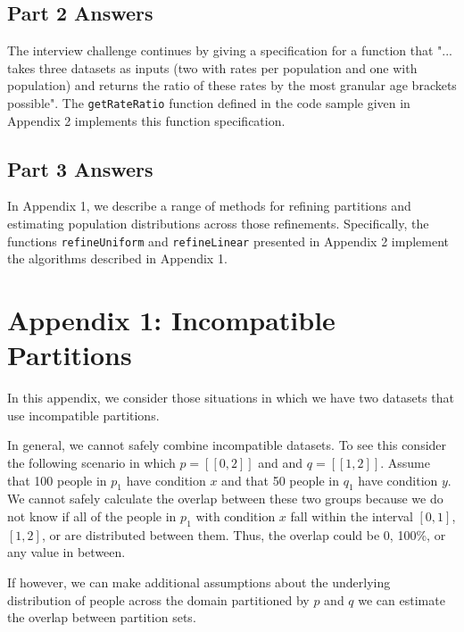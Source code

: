 \documentclass[]{article}
\begin{document}
\hypertarget{part-2-answers}{%
\subsection{Part 2 Answers}\label{part-2-answers}}

The interview challenge continues by giving a specification for a
function that "... takes three datasets as inputs (two with rates per
population and one with population) and returns the ratio of these rates
by the most granular age brackets possible". The \texttt{getRateRatio}
function defined in the code sample given in Appendix 2 implements this
function specification.

\hypertarget{part-3-answers}{%
\subsection{Part 3 Answers}\label{part-3-answers}}

In Appendix 1, we describe a range of methods for refining partitions
and estimating population distributions across those refinements.
Specifically, the functions \texttt{refineUniform} and
\texttt{refineLinear} presented in Appendix 2 implement the algorithms
described in Appendix 1.

\hypertarget{appendix-1-incompatible-partitions}{%
\section{Appendix 1: Incompatible
Partitions}\label{appendix-1-incompatible-partitions}}

In this appendix, we consider those situations in which we have two
datasets that use incompatible partitions.

In general, we cannot safely combine incompatible datasets. To see this
consider the following scenario in which \(p = [[0, 2]]\) and and
\(q = [[1, 2]]\). Assume that 100 people in \(p_1\) have condition \(x\)
and that 50 people in \(q_1\) have condition \(y\). We cannot safely
calculate the overlap between these two groups because we do not know if
all of the people in \(p_1\) with condition \(x\) fall within the
interval \([0, 1]\), \([1, 2]\), or are distributed between them. Thus,
the overlap could be 0, 100\%, or any value in between.

If however, we can make additional assumptions about the underlying
distribution of people across the domain partitioned by \(p\) and \(q\)
we can estimate the overlap between partition sets.
\end{document}
